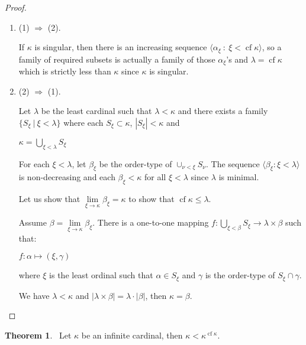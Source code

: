 \documentclass[8pt]{article}
\theoremstyle{definition}
\theoremstyle{definition}
\newtheorem{theorem}{Theorem}[section]
\theoremstyle{definition}
\theoremstyle{definition}
\theoremstyle{definition}
\theoremstyle{definition}
\theoremstyle{definition}
\theoremstyle{definition}
\theoremstyle{definition}
\theoremstyle{definition}
\theoremstyle{definition}
\theoremstyle{definition}
\theoremstyle{definition}
\theoremstyle{definition}
\theoremstyle{question}
\begin{document}
\begin{proof}
  $ $

  \begin{enumerate}
    \item (1) $\Rightarrow$ (2).

    If $\kappa$ is singular, then there is an increasing sequence 
    $\langle \alpha_{\xi} \: : \: \xi < \operatorname{cf} \kappa \rangle$, so a family of required subsets is
    actually a family of those $\alpha_{\xi}$'s and $\lambda = \operatorname{cf} \kappa$ which is strictly less than $\kappa$
    since $\kappa$ is singular.
    \item (2) $\Rightarrow$ (1).
    
    Let $\lambda$ be the least cardinal such that $\lambda < \kappa$ and there exists a family
    $\{ S_{\xi} \: | \: \xi < \lambda \}$ where each $S_{\xi} \subset \kappa$, $|S_{\xi}| < \kappa$ and
    \begin{center}
      $\kappa = \bigcup \limits_{\xi < \lambda} S_{\xi}$
    \end{center}

    For each $\xi < \lambda$, let $\beta_{\xi}$ be the order-type of 
    $\cup_{\nu < \xi} S_{\nu}$. The sequence $\langle \beta_{\xi} : \xi < \lambda \rangle$ is non-decreasing and 
    each $\beta_{\xi} < \kappa$ for all $\xi < \lambda$ since $\lambda$ is minimal.

    Let us show that $\lim \limits_{\xi \to \kappa} \beta_{\xi} = \kappa$ to show that 
    $\operatorname{cf} \kappa \leq \lambda$.

    Assume $\beta = \lim \limits_{\xi \to \kappa} \beta_{\xi}$. There is a one-to-one mapping 
    $f : \bigcup \limits_{\xi < \beta} S_{\xi} \to \lambda \times \beta$ such that:
    \begin{center}
      $f : \alpha \mapsto (\xi, \gamma)$
    \end{center}
    where $\xi$ is the least ordinal such that $\alpha \in S_{\xi}$ and $\gamma$ is the order-type of $S_{\xi} \cap \gamma$.

    We have $\lambda < \kappa$ and $|\lambda \times \beta| = \lambda \cdot |\beta|$, then $\kappa = \beta$.
  \end{enumerate}
\end{proof}

\begin{theorem}~\label{expcofin}
  Let $\kappa$ be an infinite cardinal, then $\kappa < \kappa^{\operatorname{cf} \kappa}$.
\end{theorem}
\end{document}
